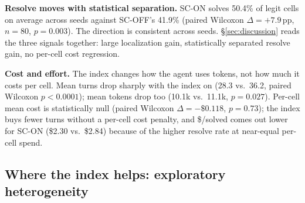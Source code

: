 \textbf{Resolve moves with statistical separation.} SC-ON solves 50.4\% of legit cells
on average across seeds against SC-OFF's 41.9\% (paired Wilcoxon $\Delta=+7.9$\,pp,
$n=80$, $p=0.003$). The direction is consistent across seeds. \S\ref{sec:discussion}
reads the three signals together: large localization gain, statistically separated
resolve gain, no per-cell cost regression.

\textbf{Cost and effort.} The index changes how the agent uses tokens, not how much it
costs per cell. Mean turns drop sharply with the index on (28.3 vs.\ 36.2, paired
Wilcoxon $p<0.0001$); mean tokens drop too (10.1k vs.\ 11.1k, $p=0.027$). Per-cell mean
cost is statistically null (paired Wilcoxon $\Delta=-\$0.118$, $p=0.73$); the index buys
fewer turns without a per-cell cost penalty, and \$/solved comes out lower for SC-ON
(\$2.30 vs.\ \$2.84) because of the higher resolve rate at near-equal per-cell spend.

\FloatBarrier
\subsection{Where the index helps: exploratory heterogeneity}
\label{sec:results-heterogeneity}

\begin{table}[!tbp]
  \centering
  \caption{Resolve and View~B acc@5 by language (Go, Java, Python), mean of seed means
    across three seeds. Exploratory; we make no significance claims.}
  \label{tab:per-language}
  \scriptsize
  \setlength{\tabcolsep}{2pt}
  
\end{table}

